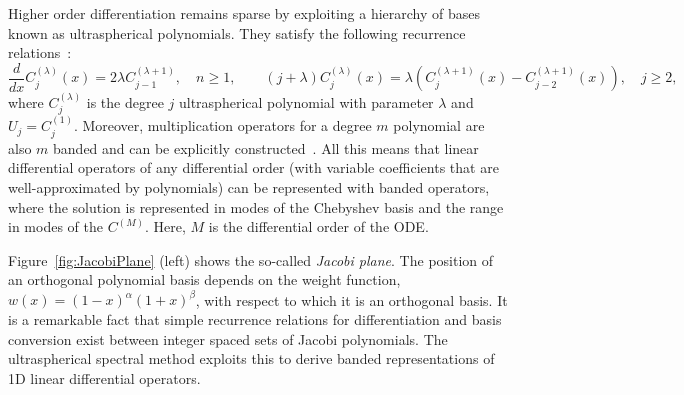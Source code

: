 \documentclass[11pt,a4paper,review]{siamart171218}
\begin{document}
Higher order differentiation remains sparse by exploiting a hierarchy of bases known as ultraspherical polynomials. They satisfy the following recurrence relations~\cite[(18.9.19),(18.9.7)]{NISTHandbook}:
\[
 \frac{d}{dx}C_j^{(\lambda)}(x) = 2\lambda C_{j-1}^{(\lambda+1)},\quad n\geq 1, \qquad (j+\lambda)C_j^{(\lambda)}(x) = \lambda\left(C_{j}^{(\lambda+1)}(x) -C_{j-2}^{(\lambda+1)}(x)\right), \quad j\geq 2,
\]
where $C^{(\lambda)}_j$ is the degree $j$ ultraspherical polynomial with parameter $\lambda$ and $U_j = C^{(1)}_j$. Moreover, multiplication operators for a degree $m$ polynomial are also $m$ banded and can be explicitly constructed~\cite{Olver_13_01}. All this means that linear differential operators of any differential order (with variable coefficients that are well-approximated by polynomials) can be represented with banded operators, where the solution is represented in modes of the Chebyshev basis and the range in modes of the $C^{(M)}$. Here, $M$ is the differential order of the ODE. 

Figure~\ref{fig:JacobiPlane} (left) shows the so-called {\em Jacobi plane}. The position of an orthogonal polynomial basis depends on the weight function, $w(x) = (1-x)^\alpha(1+x)^\beta$, with respect to which it is an orthogonal basis.  It is a remarkable fact that simple recurrence relations for differentiation and basis conversion exist between integer spaced sets of Jacobi polynomials. The ultraspherical spectral method exploits this to derive banded representations of 1D linear differential operators. 
\end{document}
